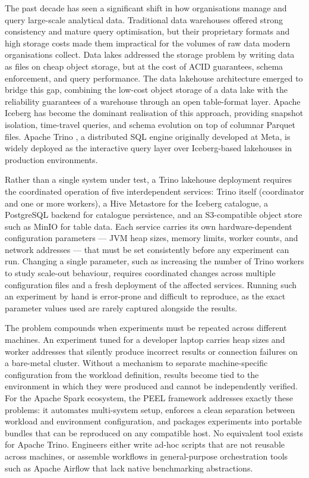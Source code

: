 \documentclass{l4proj}
\begin{document}
The past decade has seen a significant shift in how organisations manage and query large-scale analytical data. Traditional data warehouses offered strong consistency and mature query optimisation, but their proprietary formats and high storage costs made them impractical for the volumes of raw data modern organisations collect. Data lakes addressed the storage problem by writing data as files on cheap object storage, but at the cost of ACID guarantees, schema enforcement, and query performance. The data lakehouse architecture \citep{armbrust2021lakehouse} emerged to bridge this gap, combining the low-cost object storage of a data lake with the reliability guarantees of a warehouse through an open table-format layer. Apache Iceberg \citep{apache_iceberg} has become the dominant realisation of this approach, providing snapshot isolation, time-travel queries, and schema evolution on top of columnar Parquet files. Apache Trino \citep{sethi2019presto}, a distributed SQL engine originally developed at Meta, is widely deployed as the interactive query layer over Iceberg-based lakehouses in production environments.

Rather than a single system under test, a Trino lakehouse deployment requires the coordinated operation of five interdependent services: Trino itself (coordinator and one or more workers), a Hive Metastore for the Iceberg catalogue, a PostgreSQL backend for catalogue persistence, and an S3-compatible object store such as MinIO for table data. Each service carries its own hardware-dependent configuration parameters --- JVM heap sizes, memory limits, worker counts, and network addresses --- that must be set consistently before any experiment can run. Changing a single parameter, such as increasing the number of Trino workers to study scale-out behaviour, requires coordinated changes across multiple configuration files and a fresh deployment of the affected services. Running such an experiment by hand is error-prone and difficult to reproduce, as the exact parameter values used are rarely captured alongside the results.

The problem compounds when experiments must be repeated across different machines. An experiment tuned for a developer laptop carries heap sizes and worker addresses that silently produce incorrect results or connection failures on a bare-metal cluster. Without a mechanism to separate machine-specific configuration from the workload definition, results become tied to the environment in which they were produced and cannot be independently verified. For the Apache Spark ecosystem, the PEEL framework \citep{peel_github} addresses exactly these problems: it automates multi-system setup, enforces a clean separation between workload and environment configuration, and packages experiments into portable bundles that can be reproduced on any compatible host. No equivalent tool exists for Apache Trino. Engineers either write ad-hoc scripts that are not reusable across machines, or assemble workflows in general-purpose orchestration tools such as Apache Airflow that lack native benchmarking abstractions.
\end{document}
